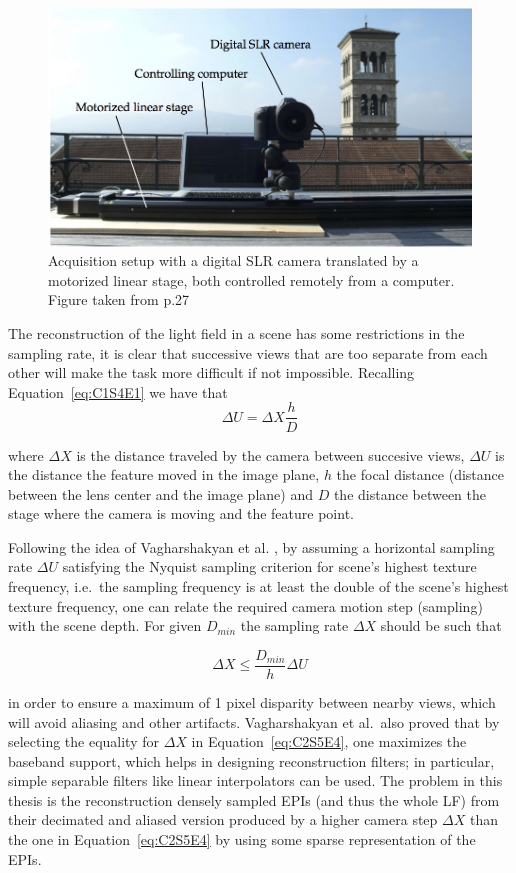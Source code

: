 \begin{figure}[h!]
\centering
\includegraphics[width = 0.93 \textwidth]{./Diagrams/setting.jpg}
\caption{Acquisition setup with a digital SLR camera translated by a motorized linear stage, both controlled remotely from a computer. Figure taken from \cite{ChangilPhD} p.27}
\label{fig:setting}
\end{figure}

\bigskip

The reconstruction of the light field in a scene has some restrictions in the sampling rate, it is clear that successive views that are too separate from each other will make the task more difficult if not impossible. Recalling Equation~\ref{eq:C1S4E1} we have that 
$$
\Delta U = \Delta X\frac{h}{D}
$$

where $\Delta X$ is the distance traveled by the camera between succesive views, $\Delta U$ is the distance the feature moved in the image plane, $h$ the focal distance (distance between the lens center and the image plane) and $D$ the distance between the stage where the camera is moving and the feature point. 

\bigskip

Following the idea of Vagharshakyan et al. \cite{LF-Shearlets}, by assuming a horizontal sampling rate $\Delta U$ satisfying the Nyquist sampling criterion for scene's highest texture frequency, i.e.\ the sampling frequency is at least the double of the scene's highest texture frequency, one can relate the required camera motion step (sampling) with the scene depth. For given $D_{min}$ the sampling rate $\Delta X$ should be such that 

\begin{equation}
\label{eq:C2S5E4}
\Delta X \leq \frac{D_{min}}{h}\Delta U
\end{equation}

in order to ensure a maximum of 1 pixel disparity between nearby views, which will avoid aliasing and other artifacts. Vagharshakyan et al.\ also proved that by selecting the equality for $\Delta X$ in Equation~\ref{eq:C2S5E4}, one maximizes the baseband support, which helps in designing reconstruction filters; in particular, simple separable filters like linear interpolators can be used. The problem in this thesis is the reconstruction densely sampled EPIs (and thus the whole LF) from their decimated and aliased version produced by a higher camera step $\Delta X$ than the one in Equation~\ref{eq:C2S5E4} by using some sparse representation of the EPIs. 


